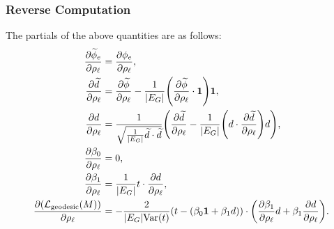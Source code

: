 \subsubsection{Reverse Computation}
The partials of the above quantities are as follows: \begin{align*}
	\frac{\partial\widetilde{\phi}_e}{\partial\rho_\ell} &= \frac{\partial\phi_e}{\partial\rho_\ell}, \\
	\frac{\partial \widetilde{d}}{\partial \rho_\ell} &= \frac{\partial\widetilde{\phi}}{\partial\rho_\ell} - \frac{1}{\abs{E_G}}\pof{\frac{\partial\widetilde{\phi}}{\partial\rho_\ell} \cdot \mathbf{1}}\mathbf{1}, \\
	\frac{\partial d}{\partial\rho_\ell} &= \frac{1}{\sqrt{\frac{1}{\abs{E_G}}\widetilde{d} \cdot \widetilde{d}}}\pof{\frac{\partial\widetilde{d}}{\partial\rho_\ell} - \frac{1}{\abs{E_G}}\pof{d \cdot \frac{\partial\widetilde{d}}{\partial\rho_\ell}}d}, \\
	\frac{\partial\beta_0}{\partial\rho_\ell} &= 0, \\
	\frac{\partial\beta_1}{\partial\rho_\ell} &= \frac{1}{\abs{E_G}}t \cdot \frac{\partial d}{\partial\rho_\ell},\\
	\frac{\partial\pof{\mathcal{L}_{\mathrm{geodesic}}\pof{M}}}{\partial\rho_\ell} &= -\frac{2}{\abs{E_G}\Var\pof{t}}\pof{t - \pof{\beta_0\mathbf{1} + \beta_1d}} \cdot \pof{\frac{\partial\beta_1}{\partial\rho_\ell}d + \beta_1\frac{\partial d}{\partial\rho_\ell}}.
\end{align*}
